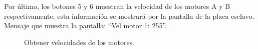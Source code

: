 \begin{description}
\item Por último, los botones 5 y 6 muestran la velocidad de los motores A y B respectivamente, esta información se mostrará por la pantalla de la placa esclavo. Mensaje que muestra la pantalla: ``Vel motor 1: 255''.
\begin{figure}[!h]
 \centering
 \caption{Obtener velocidades de los motores.}
 \label{MU5}
\end{figure}

\end{description}



